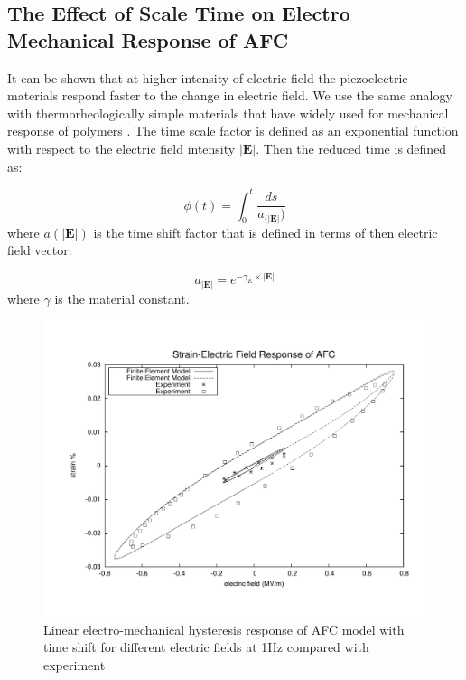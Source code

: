 \subsection{The Effect of Scale Time on Electro Mechanical Response of AFC}
It can be shown that at higher intensity of electric field the piezoelectric materials respond faster to the change in electric field.
We use the same analogy with thermorheologically simple materials that have widely used for mechanical response of polymers \cite{haj2004numerical, tscharnuter2012nonlinear}.
The time scale factor is defined as an exponential function with respect to the electric field intensity $|\textbf {E}|$.
Then the reduced time is defined as:

\begin{equation}
	\phi(t) = \int_0^t \frac{ ds } { a_{( |\textbf {E}| } ) } 
\label{equation:time_scaling}	
\end{equation}
where ${a(|\textbf {E}|)}$ is the time shift factor that is defined in terms of then electric field vector:
 
\begin{equation}
a_{ |\textbf {E}| }=e^{-\gamma_{E} \times |\textbf {E}|}
\label{equation:time_scaling_factor}	
\end{equation}
where $\gamma$ is the material constant.
\begin{figure} 
\centering
\includegraphics[trim = 0mm 0mm 0mm 0mm,width=5.0in]
{./chap_4_structural_analyses/afc_unit_cell/linear_hysteris_time_shift_afc/time_shift_afc_electric_field_vs_strains.pdf}
\caption{Linear electro-mechanical hysteresis response of AFC model with time shift for different electric fields at 1Hz compared with experiment}
\label{fig:time_shift_afc_electric_field_vs_strains}
\end{figure}

